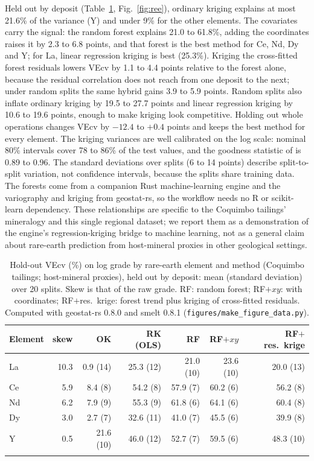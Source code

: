 \documentclass[pdflatex,sn-mathphys-ay]{sn-jnl}
\begin{document}
Held out by deposit (Table~\ref{tab:ree}, Fig.~\ref{fig:ree}), ordinary
kriging explains at most 21.6\% of the variance (Y) and under 9\% for the other
elements. The covariates carry the signal: the random forest explains 21.0 to
61.8\%, adding the coordinates raises it by 2.3 to 6.8 points, and that forest
is the best method for Ce, Nd, Dy and Y; for La, linear regression kriging is
best (25.3\%). Kriging the cross-fitted forest residuals lowers VEcv by 1.1 to
4.4 points relative to the forest alone, because the residual correlation does
not reach from one deposit to the next; under random splits the same hybrid
gains 3.9 to 5.9 points. Random splits also inflate ordinary kriging by 19.5 to
27.7 points and linear regression kriging by 10.6 to 19.6 points, enough to
make kriging look competitive. Holding out whole operations changes VEcv by
$-12.4$ to $+0.4$ points and keeps the best method for every element. The
kriging variances are well calibrated on the log scale: nominal 80\% intervals
cover 78 to 86\% of the test values, and the goodness statistic of
\citet{deutsch1997} is 0.89 to 0.96. The standard deviations over splits (6 to
14 points) describe split-to-split variation, not confidence intervals,
because the splits share training data. The forests come from a companion Rust
machine-learning engine \citep{smelt} and the variography and kriging from
geostat-rs, so the workflow needs no R or scikit-learn dependency. These
relationships are specific to the Coquimbo tailings' mineralogy and this single
regional dataset; we report them as a demonstration of the engine's
regression-kriging bridge to machine learning, not as a general claim about
rare-earth prediction from host-mineral proxies in other geological
settings.

\begin{table}[t]
\centering
\small
\caption{Hold-out VEcv (\%) on log grade by rare-earth element and
method (Coquimbo tailings; host-mineral proxies), held out by deposit: mean
(standard deviation) over 20 splits. Skew is that of the raw grade. RF: random
forest; RF$+xy$: with coordinates; RF$+$res.\ krige: forest trend plus kriging
of cross-fitted residuals. Computed with geostat-rs 0.8.0 and smelt 0.8.1
(\texttt{figures/make\_figure\_data.py}).}
\label{tab:ree}
\begin{tabular}{@{}lrrrrrr@{}}
\toprule
Element & skew & OK & RK (OLS) & RF & RF$+xy$ & RF$+$res.\ krige \\
\midrule
La & 10.3 & 0.9 (14) & 25.3 (12) & 21.0 (10) & 23.6 (10) & 20.0 (13) \\
Ce & 5.9 & 8.4 (8) & 54.2 (8) & 57.9 (7) & 60.2 (6) & 56.2 (8) \\
Nd & 6.2 & 7.9 (9) & 55.3 (9) & 61.8 (6) & 64.1 (6) & 60.4 (8) \\
Dy & 3.0 & 2.7 (7) & 32.6 (11) & 41.0 (7) & 45.5 (6) & 39.9 (8) \\
Y  & 0.5 & 21.6 (10) & 46.0 (12) & 52.7 (7) & 59.5 (6) & 48.3 (10) \\
\botrule
\end{tabular}
\end{table}
\end{document}
